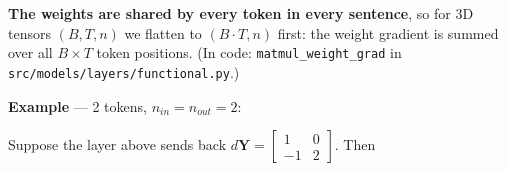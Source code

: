 \documentclass[11pt,a4paper,oneside]{report}
\begin{document}
\textbf{The weights are shared by every token in every sentence}, so for 3D tensors \((B, T, n)\) we flatten to \((B \cdot T, n)\) first: the weight gradient is summed over all \(B \times T\) token positions. (In code: \texttt{matmul\_\allowbreak{}weight\_\allowbreak{}grad} in \texttt{src/\allowbreak{}models/\allowbreak{}layers/\allowbreak{}functional.\allowbreak{}py}.)

\textbf{Example} --- 2 tokens, \(n_{in} = n_{out} = 2\):

\begin{center}\end{center}

Suppose the layer above sends back \(d\mathbf{Y} = \begin{bmatrix} 1 & 0 \\ -1 & 2 \end{bmatrix}\). Then

\begin{center}\end{center}

\begin{center}\end{center}
\end{document}
